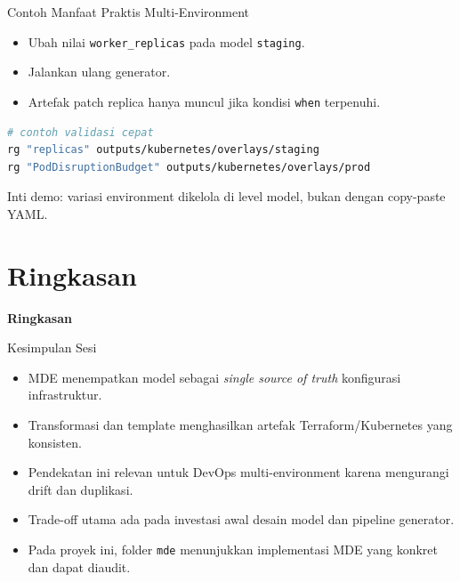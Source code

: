 \documentclass[aspectratio=169, table]{beamer}
\begin{document}
\begin{frame}[fragile]{Contoh Manfaat Praktis Multi-Environment}
\vspace{8pt}
\begin{itemize}
  \item Ubah nilai \texttt{worker\_replicas} pada model \texttt{staging}.
  \item Jalankan ulang generator.
  \item Artefak patch replica hanya muncul jika kondisi \texttt{when} terpenuhi.
\end{itemize}

\vspace{6pt}
\begin{lstlisting}[language=bash]
# contoh validasi cepat
rg "replicas" outputs/kubernetes/overlays/staging
rg "PodDisruptionBudget" outputs/kubernetes/overlays/prod
\end{lstlisting}

\vspace{6pt}
\small
Inti demo: variasi environment dikelola di level model, bukan dengan copy-paste YAML.
\end{frame}

\section{Ringkasan}
\begin{frame}{\hfill}
	\centering
	\Huge{\textbf{Ringkasan}}
\end{frame}

\begin{frame}{Kesimpulan Sesi}
\vspace{8pt}
\begin{itemize}
  \item MDE menempatkan model sebagai \textit{single source of truth} konfigurasi infrastruktur.
  \item Transformasi dan template menghasilkan artefak Terraform/Kubernetes yang konsisten.
  \item Pendekatan ini relevan untuk DevOps multi-environment karena mengurangi drift dan duplikasi.
  \item Trade-off utama ada pada investasi awal desain model dan pipeline generator.
  \item Pada proyek ini, folder \texttt{mde} menunjukkan implementasi MDE yang konkret dan dapat diaudit.
\end{itemize}
\end{frame}
\end{document}
